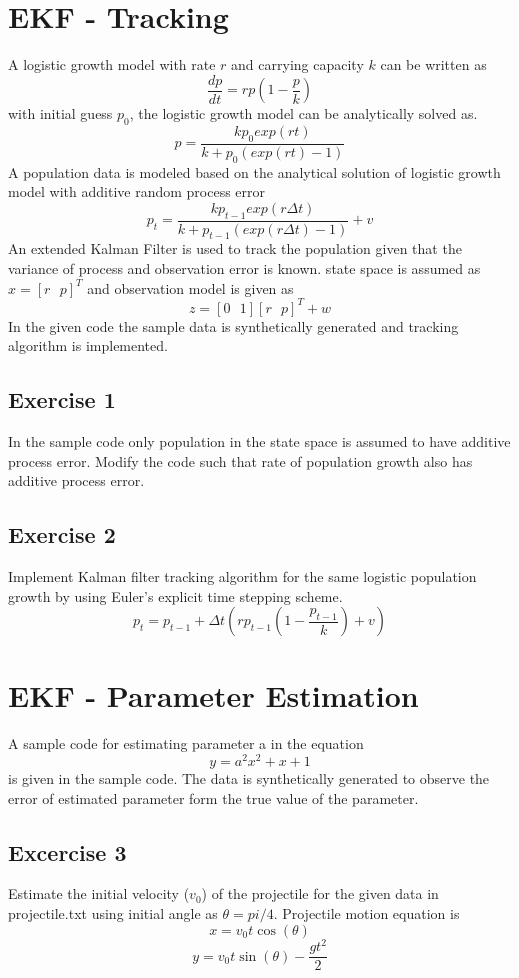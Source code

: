 \documentclass{article}
\begin{document}
\section{EKF - Tracking}
A logistic growth model with rate $r$ and carrying capacity $k$ can be written as
$$\frac{dp}{dt}=rp\left( 1-\frac{p}{k}\right)$$
with initial guess $p_0$, the logistic growth model can be analytically solved as.
$$p=\frac{kp_0exp(rt)}{k+p_0(exp(rt)-1)}$$
A population data is modeled based on the analytical solution of logistic growth model with additive random process error
$$p_{t}=\frac{kp_{t-1}exp(r \Delta t)}{k+p_{t-1}(exp(r \Delta t)-1)} + v$$
An extended Kalman Filter is used to track the population given that the variance of process and observation error is known. state space is assumed as $x=[r \text{  }  p]^T$ and observation model is given as
$$z=[0\text{  }  1][r\text{  }  p]^T+w$$
In the given code the sample data is  synthetically generated and tracking algorithm is implemented.

\subsection{Exercise 1}
In the sample code only population in the state space is assumed to have additive process error. Modify the code such that rate of population growth also has additive process error. 
\subsection{Exercise 2}
Implement Kalman filter tracking algorithm for the same logistic population growth by using Euler's explicit time stepping scheme.
$$p_t=p_{t-1}+\Delta t \left( rp_{t-1}\left( 1-\frac{p_{t-1}}{k}\right)+ v\right )$$

\section{EKF - Parameter Estimation}
A sample code for estimating parameter a in the equation $$y=a^2x^2+x+1$$ is given in the sample code.  The data is synthetically generated to observe the error of estimated parameter form the true value of the parameter.
\subsection{Excercise 3}
Estimate the initial velocity ($v_0$) of the projectile for the given data in projectile.txt using initial angle as $\theta = pi/4$. Projectile motion equation is 
$$x=v_0t\cos(\theta)$$
$$y=v_0t\sin(\theta)-\frac{gt^2}{2}$$
\end{document}

